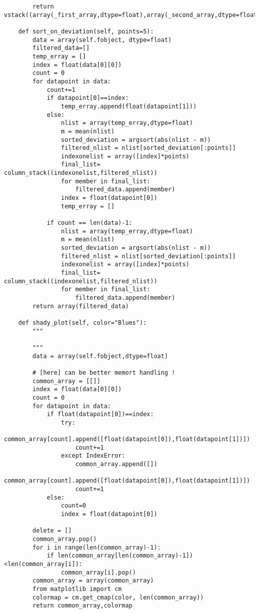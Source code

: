 \documentclass[draft,12pt]{article}
\begin{document}
\begin{verbatim}
        return vstack((array(_first_array,dtype=float),array(_second_array,dtype=float))).T
        
    def sort_on_deviation(self, points=5):
        data = array(self.fobject, dtype=float)
        filtered_data=[]
        temp_erray = []
        index = float(data[0][0])
        count = 0
        for datapoint in data:
            count+=1
            if datapoint[0]==index:
                temp_erray.append(float(datapoint[1]))
            else:
                nlist = array(temp_erray,dtype=float)
                m = mean(nlist)
                sorted_deviation = argsort(abs(nlist - m))
                filtered_nlist = nlist[sorted_deviation[:points]]
                indexonelist = array([index]*points)
                final_list= column_stack((indexonelist,filtered_nlist))
                for member in final_list:
                    filtered_data.append(member)
                index = float(datapoint[0])
                temp_erray = []

            if count == len(data)-1:
                nlist = array(temp_erray,dtype=float)
                m = mean(nlist)
                sorted_deviation = argsort(abs(nlist - m))
                filtered_nlist = nlist[sorted_deviation[:points]]
                indexonelist = array([index]*points)
                final_list= column_stack((indexonelist,filtered_nlist))
                for member in final_list:
                    filtered_data.append(member)
        return array(filtered_data)
    
    def shady_plot(self, color="Blues"):
        """
        
        """
        data = array(self.fobject,dtype=float)
        
        # [here] can be better memort handling !
        common_array = [[]]
        index = float(data[0][0])
        count = 0
        for datapoint in data:
            if float(datapoint[0])==index:
                try:
                    common_array[count].append([float(datapoint[0]),float(datapoint[1])])
                    count+=1
                except IndexError:
                    common_array.append([])
                    common_array[count].append([float(datapoint[0]),float(datapoint[1])])
                    count+=1
            else:
                count=0
                index = float(datapoint[0])

        delete = []
        common_array.pop()
        for i in range(len(common_array)-1):    
            if len(common_array[len(common_array)-1])<len(common_array[i]):
                common_array[i].pop()
        common_array = array(common_array)
        from matplotlib import cm
        colormap = cm.get_cmap(color, len(common_array))
        return common_array,colormap
        

\end{verbatim}
\end{document}
